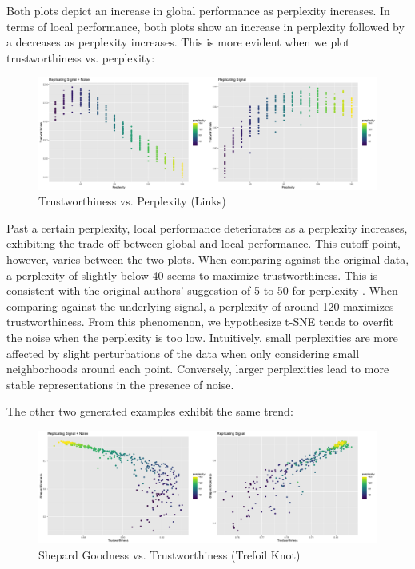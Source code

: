 \documentclass{article}
\begin{document}
Both plots depict an increase in global performance as perplexity increases. In terms of local performance, both plots show an increase in perplexity followed by a decreases as perplexity increases. This is more evident when we plot trustworthiness vs. perplexity:

\begin{figure}[H]
\includegraphics[scale=0.25]{trust plot (links)}
\centering
\caption{Trustworthiness vs. Perplexity (Links)}
\end{figure}

Past a certain perplexity, local performance deteriorates as a perplexity increases, exhibiting the trade-off between global and local performance. This cutoff point, however, varies between the two plots. When comparing against the original data, a perplexity of slightly below 40 seems to maximize trustworthiness. This is consistent with the original authors' suggestion of 5 to 50 for perplexity \cite{t-SNE}. When comparing against the underlying signal, a perplexity of around 120 maximizes trustworthiness. From this phenomenon, we hypothesize t-SNE tends to overfit the noise when the perplexity is too low. Intuitively, small perplexities are more affected by slight perturbations of the data when only considering small neighborhoods around each point. Conversely, larger perplexities lead to more stable representations in the presence of noise.

\bigbreak The other two generated examples exhibit the same trend:

\begin{figure}[H]
\includegraphics[scale=0.25]{trefoil plot}
\centering
\caption{Shepard Goodness vs. Trustworthiness (Trefoil Knot)}
\end{figure}
\end{document}
